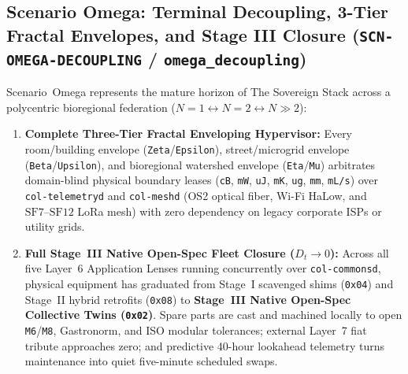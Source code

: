 \subsection{Scenario Omega: Terminal Decoupling, 3-Tier Fractal Envelopes, and Stage III Closure (\texttt{SCN-OMEGA-DECOUPLING} / \texttt{omega\_decoupling})}

Scenario~Omega represents the mature horizon of The Sovereign Stack across a polycentric bioregional federation ($N=1 \leftrightarrow N=2 \leftrightarrow N \gg 2$):
\begin{enumerate}
    \item \textbf{Complete Three-Tier Fractal Enveloping Hypervisor:} Every room/building envelope (\texttt{Zeta}/\texttt{Epsilon}), street/microgrid envelope (\texttt{Beta}/\texttt{Upsilon}), and bioregional watershed envelope (\texttt{Eta}/\texttt{Mu}) arbitrates domain-blind physical boundary leases (\texttt{cB}, \texttt{mW}, \texttt{uJ}, \texttt{mK}, \texttt{ug}, \texttt{mm}, \texttt{mL/s}) over \texttt{col-telemetryd} and \texttt{col-meshd} (OS2 optical fiber, Wi-Fi HaLow, and $\mathrm{SF7}\text{--}\mathrm{SF12}$ LoRa mesh) with zero dependency on legacy corporate ISPs or utility grids.
    \item \textbf{Full Stage~III Native Open-Spec Fleet Closure ($D_t \to 0$):} Across all five Layer~6 Application Lenses running concurrently over \texttt{col-commonsd}, physical equipment has graduated from Stage~I scavenged shims (\texttt{0x04}) and Stage~II hybrid retrofits (\texttt{0x08}) to \textbf{Stage~III Native Open-Spec Collective Twins (\texttt{0x02})}. Spare parts are cast and machined locally to open \texttt{M6}/\texttt{M8}, Gastronorm, and ISO modular tolerances; external Layer~7 fiat tribute approaches zero; and predictive 40-hour lookahead telemetry turns maintenance into quiet five-minute scheduled swaps.
\end{enumerate}
